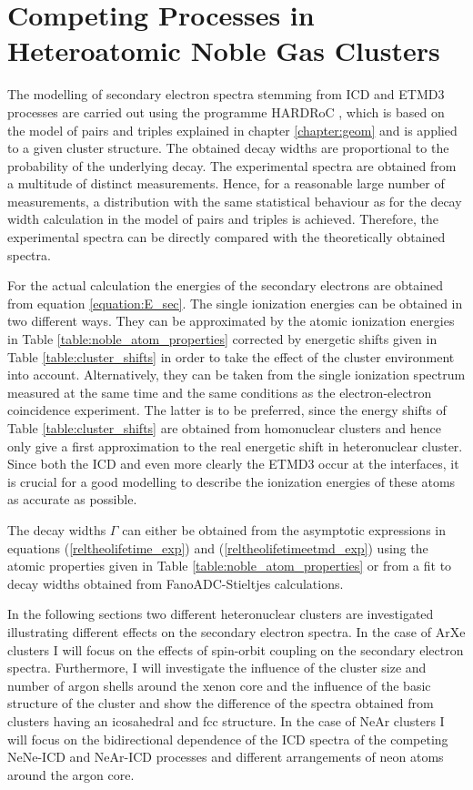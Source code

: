 \chapter[Heteroatomic Noble Gas Clusters]{Competing Processes in Heteroatomic Noble Gas Clusters}
\label{chapter_clusters}

The modelling of secondary electron spectra stemming from \ac{ICD}
and \ac{ETMD}3 processes are carried out using the programme
HARDRoC \cite{HARDRoC}, which is based on the model of pairs and
triples explained in chapter \ref{chapter:geom} and is applied
to a given cluster structure. The obtained
decay widths are proportional to the probability of the underlying decay.
The experimental spectra are obtained from a multitude of distinct measurements.
Hence, for a reasonable large number of measurements, a distribution with the
same statistical behaviour as for the decay width calculation in the
model of pairs and triples is achieved. Therefore, the experimental spectra
can be directly compared with the theoretically obtained spectra.

For the actual calculation the energies of the secondary electrons are obtained
from equation \ref{equation:E_sec}. The single ionization energies
can be obtained in two different ways. They can be
approximated by the atomic ionization energies in Table
\ref{table:noble_atom_properties} corrected by energetic shifts
given in Table \ref{table:cluster_shifts} in order to take
the effect of the cluster environment into account. 
Alternatively, they can be taken from the single ionization spectrum
measured at the same time and the same conditions as the electron-electron
coincidence experiment. The latter is to be preferred, since the energy shifts
of Table \ref{table:cluster_shifts} are obtained from homonuclear clusters and
hence only give a first approximation to the real energetic shift in
heteronuclear cluster. Since both the \ac{ICD} and even more clearly the
\ac{ETMD}3 occur at the interfaces, it is crucial for a good modelling to
describe the ionization energies of these atoms as accurate as possible.

The decay widths $\Gamma$ can either be obtained from the asymptotic expressions
in equations (\ref{reltheolifetime_exp}) and (\ref{reltheolifetimeetmd_exp})
using the atomic properties given in Table \ref{table:noble_atom_properties}
or from a fit to decay widths obtained from FanoADC-Stieltjes calculations.

In the following sections two different heteronuclear clusters are investigated
illustrating different effects on the secondary electron spectra.
In the case of ArXe clusters I will focus on the effects of spin-orbit coupling
on the secondary electron spectra. Furthermore, I will investigate the influence
of the cluster size and number of argon shells around the xenon core and
the influence of the basic structure of the cluster and show the
difference of the spectra
obtained from clusters having an icosahedral
and \ac{fcc} structure.
In the case of NeAr clusters I will focus on the bidirectional dependence of
the ICD spectra of the competing NeNe-ICD and NeAr-ICD processes and
different arrangements of neon atoms around the argon core.

\newpage

\newpage


